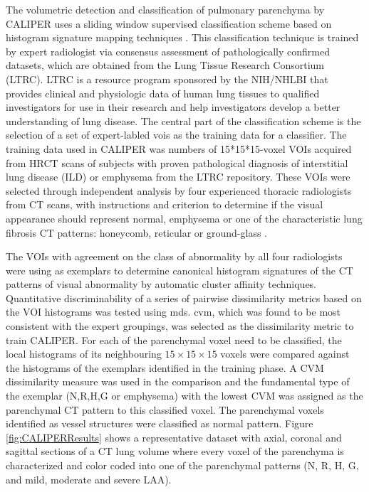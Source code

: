 The volumetric detection and classification of pulmonary parenchyma by CALIPER uses a sliding window supervised classification scheme based on histogram signature mapping techniques \citep{zavaletta2007high}. This classification technique is trained by expert radiologist via consensus assessment of pathologically confirmed datasets, which are obtained from the Lung Tissue Research Consortium (LTRC). LTRC is a resource program sponsored by the NIH/NHLBI that provides clinical and physiologic data of human lung tissues to qualified investigators for use in their research and help investigators develop a better understanding of lung disease. The central part of the classification scheme is the selection of a set of expert-labled \gls{vois} as the training data for a classifier. The training data used in CALIPER was numbers of 15*15*15-voxel VOIs acquired from HRCT scans of subjects with proven pathological diagnosis of interstitial lung disease (ILD) or emphysema from the LTRC repository. These VOIs were selected through independent analysis by four experienced thoracic radiologists from CT scans, with instructions and criterion to determine if the visual appearance should represent normal, emphysema or one of the characteristic lung fibrosis CT patterns: honeycomb, reticular or ground-glass \citep{maldonado2013automated,bartholmai2013quantitative}.

The VOIs with agreement on the class of abnormality by all four radiologists were using as exemplars to determine canonical histogram signatures of the CT patterns of visual abnormality by automatic cluster affinity techniques. Quantitative discriminability of a series of pairwise dissimilarity metrics based on the VOI histograms was tested using \gls{mds}. \gls{cvm}, which was found to be most consistent with the expert groupings, was selected as the dissimilarity metric to train CALIPER. For each of the parenchymal voxel need to be classified, the local histograms of its neighbouring $15 \times 15 \times 15$ voxels were compared against the histograms of the exemplars identified in the training phase. A CVM dissimilarity measure was used in the comparison and the fundamental type of the exemplar (N,R,H,G or emphysema) with the lowest CVM was assigned as the parenchymal CT pattern to this classified voxel. The parenchymal voxels identified as vessel structures were classified as normal pattern. Figure \ref{fig:CALIPERResults} shows a representative dataset with axial, coronal and sagittal sections of a CT lung volume where every voxel of the parenchyma is characterized and color coded into one of the parenchymal patterns (N, R, H, G, and mild, moderate and severe LAA). 

